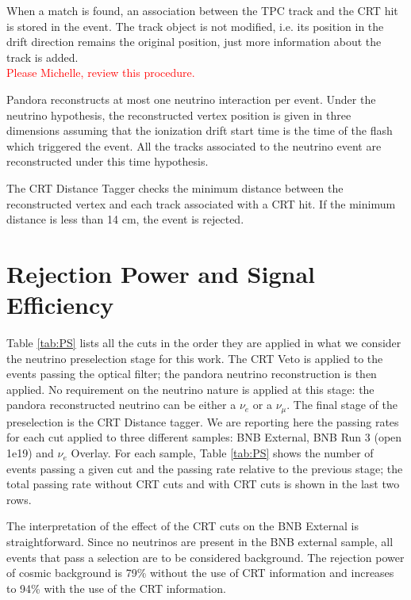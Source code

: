 When a match is found, an association between the TPC track and the CRT hit is stored in the event. The track object is not modified, i.e. its position in the drift direction remains the original position, just more information about the track is added.\\
\textcolor{red}{Please Michelle, review this procedure.}

Pandora reconstructs at most one neutrino interaction per event. Under the neutrino hypothesis, the reconstructed vertex position is given in three dimensions assuming that the ionization drift start time is the time of the flash which triggered the event. All the tracks associated to the neutrino event are reconstructed under this time hypothesis. 

The CRT Distance Tagger checks the minimum distance between the reconstructed vertex and each track associated with a CRT hit. If the minimum distance is less than 14 cm, the event is rejected.

\newpage
\section{Rejection Power and Signal Efficiency}\label{sec:RejectionAndEff}

Table \ref{tab:PS} lists all the cuts in the order they are applied in what we consider the neutrino preselection stage for this work. The CRT Veto is applied to the events passing the optical filter; the pandora neutrino reconstruction is then applied. No requirement on the neutrino nature is applied at this stage: the pandora reconstructed neutrino can be either a $\nu_e$ or a $\nu_\mu$. The final stage of the preselection is the CRT Distance tagger. 
We are reporting here the passing rates for each cut applied to three different samples:  BNB External,  BNB Run 3 (open 1e19) and  $\nu_e$ Overlay. For each sample, Table \ref{tab:PS} shows the number of events passing a given cut and the  passing rate relative to the previous stage; the total passing rate without CRT cuts and with CRT cuts is shown in the last two rows.

The interpretation of the effect of the CRT cuts on the BNB External is straightforward. Since no neutrinos are present in the BNB external sample, all events that pass a selection are to be considered background.  The rejection power of cosmic background is 79\% without the use of CRT information and increases to 94\% with the use of the CRT information.

